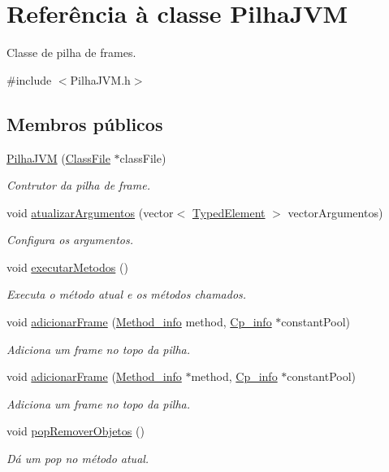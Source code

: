 \hypertarget{classPilhaJVM}{}\section{Referência à classe Pilha\+J\+VM}
\label{classPilhaJVM}


Classe de pilha de frames.  




{\ttfamily \#include $<$Pilha\+J\+V\+M.\+h$>$}

\subsection*{Membros públicos}
\begin{DoxyCompactItemize}
\item 
\hyperlink{classPilhaJVM_a9acc6081073376a6f658c9dcfd3f6011}{Pilha\+J\+VM} (\hyperlink{classClassFile}{Class\+File} $\ast$class\+File)
\begin{DoxyCompactList}\small\item\em Contrutor da pilha de frame. \end{DoxyCompactList}\item 
void \hyperlink{classPilhaJVM_a43252c128cf31ac202373d6b66868a77}{atualizar\+Argumentos} (vector$<$ \hyperlink{BasicTypes_8h_a97b332303b1262282599e6ede0637b82}{Typed\+Element} $>$ vector\+Argumentos)
\begin{DoxyCompactList}\small\item\em Configura os argumentos. \end{DoxyCompactList}\item 
void \hyperlink{classPilhaJVM_a8c87f8255b289be137dd09360d135e86}{executar\+Metodos} ()
\begin{DoxyCompactList}\small\item\em Executa o método atual e os métodos chamados. \end{DoxyCompactList}\item 
void \hyperlink{classPilhaJVM_a9add990f9c258d39d2fcd791398c96ac}{adicionar\+Frame} (\hyperlink{structMethod__info}{Method\+\_\+info} method, \hyperlink{structCp__info}{Cp\+\_\+info} $\ast$constant\+Pool)
\begin{DoxyCompactList}\small\item\em Adiciona um frame no topo da pilha. \end{DoxyCompactList}\item 
void \hyperlink{classPilhaJVM_a6a47624a1e9923e59258454e6e6d1271}{adicionar\+Frame} (\hyperlink{structMethod__info}{Method\+\_\+info} $\ast$method, \hyperlink{structCp__info}{Cp\+\_\+info} $\ast$constant\+Pool)
\begin{DoxyCompactList}\small\item\em Adiciona um frame no topo da pilha. \end{DoxyCompactList}\item 
void \hyperlink{classPilhaJVM_a4f83f8d59b436cb1813a2a35e1538045}{pop\+Remover\+Objetos} ()
\begin{DoxyCompactList}\small\item\em Dá um pop no método atual. \end{DoxyCompactList}\end{DoxyCompactItemize}
